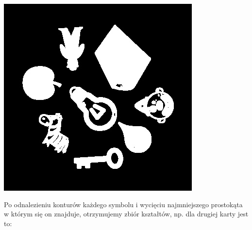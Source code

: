 \documentclass[10pt,a4paper]{article}
\begin{document}
\begin{center}
\includegraphics[scale=0.25]{2.1/5.jpg}
\end{center}
Po odnalezieniu konturów każdego symbolu i wycięciu najmniejszego prostokąta w którym się on znajduje, otrzymujemy zbiór kształtów, np. dla drugiej karty jest to:\\
\end{document}
